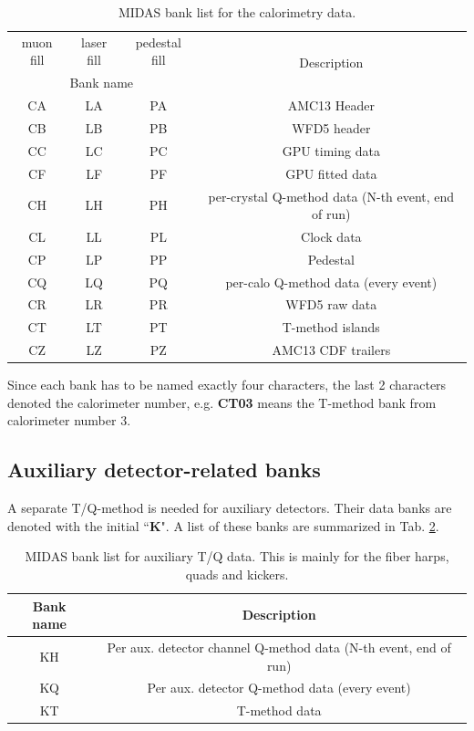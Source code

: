 \begin{table}[htbp]
\centering
\caption{MIDAS bank list for the calorimetry data.}
\begin{tabular}{|c|c|c|c|}
\hline 
muon fill& laser fill & pedestal fill  & \multirow{2}{*}{Description} \\ \cline{1-3}
\multicolumn{3}{|c|}{Bank name} & \\
\hline
CA & LA & PA & AMC13 Header \\ 
\hline 
CB & LB & PB & WFD5 header \\ 
\hline 
CC & LC & PC & GPU timing data \\ 
\hline 
CF & LF & PF & GPU fitted data \\ 
\hline 
CH & LH & PH & per-crystal Q-method data (N-th event, end of run) \\ 
\hline 
CL & LL & PL & Clock data \\ 
\hline 
CP & LP & PP & Pedestal\\ 
\hline 
CQ & LQ & PQ & per-calo Q-method data (every event) \\ 
\hline 
CR & LR & PR & WFD5 raw data \\ 
\hline 
CT & LT & PT & T-method islands \\ 
\hline 
CZ & LZ & PZ & AMC13 CDF trailers \\ 
\hline 
\end{tabular} 
\label{tab:calotable}
\end{table}

Since each bank has to be named exactly four characters, the last 2 characters denoted the calorimeter number, e.g. \textbf{CT03} means the T-method bank from calorimeter number 3.

\subsection{Auxiliary detector-related banks}

A separate T/Q-method is needed for auxiliary detectors. Their data banks are denoted with the initial ``\textbf{K}".
A list of these banks are summarized in Tab. \ref{tab:auxtable}.

\begin{table}[htbp]
\centering
\caption{MIDAS bank list for auxiliary T/Q data. This is mainly for the fiber harps, quads and kickers.}
\begin{tabular}{|c|c|}
\hline 
Bank name  & Description \\
\hline
KH &  Per aux. detector channel Q-method data (N-th event, end of run)\\
\hline
KQ &  Per aux. detector Q-method data (every event)\\
\hline
KT & T-method data \\
\hline
\end{tabular} 
\label{tab:auxtable}
\end{table}

